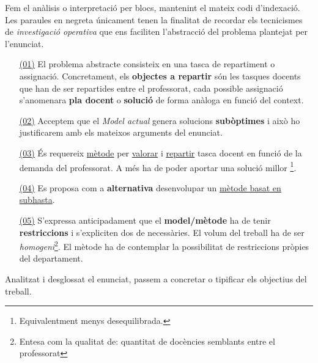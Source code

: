 \documentclass[10pt]{proc}
\begin{document}
Fem el anàlisis o interpretació per blocs, mantenint el mateix codi d'indexació. Les paraules en negreta únicament tenen la finalitat de recordar els tecnicismes de \textit{investigació operativa} que ens faciliten l'abstracció del problema plantejat per l'enunciat.
\begin{itemize}
\item[{ \color{cyan!60} \underline{\underline{\normalcolor (01)}}}] El problema abstracte consisteix en una tasca de repartiment o assignació. Concretament, els \textbf{objectes a repartir} són les tasques docents que han de ser repartides entre  el professorat, cada possible assignació s'anomenara \textbf{pla docent} o \textbf{solució} de forma anàloga en funció del context.\\
\item[{ \color{blue!60} \underline{\underline{\normalcolor (02)}}}] Acceptem que el \textit{Model actual} genera solucions \textbf{subòptimes} i això ho  justificarem amb els mateixos arguments del enunciat.\\
\item[{ \color{green!60} \underline{\underline{\normalcolor (03)}}}] És requereix { \color{green!60} \underline{\normalcolor mètode}} per { \color{green!60} \underline{\normalcolor valorar}} i { \color{green!60} \underline{\normalcolor repartir}} tasca docent en funció de la demanda del professorat. A més ha de poder aportar una solució millor \footnote{Equivalentment menys desequilibrada.}. 
\item[{ \color{purple!60} \underline{\underline{\normalcolor (04)}}}] Es proposa com a \textbf{alternativa}  desenvolupar un  { \color{purple!60} \underline{\normalcolor mètode basat en subhasta}}.
\item[{ \color{violet!60} \underline{\underline{\normalcolor (05)}}}] S'expressa anticipadament que el \textbf{model/mètode} ha de tenir \textbf{restriccions}  i s'expliciten dos de necessàries. El volum del treball ha de ser \textit{homogeni}\footnote{Entesa com la qualitat de: quantitat de docències semblants entre el professorat}. El mètode ha de contemplar la possibilitat de restriccions pròpies del departament. 
\end{itemize}
Analitzat i desglossat el enunciat, passem a concretar o tipificar els objectius del treball.
\end{document}
